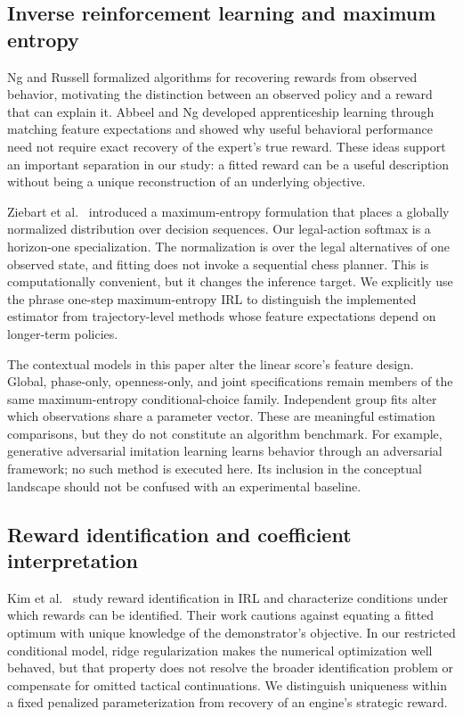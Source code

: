 \documentclass{jcst}
\begin{document}
\subsection{Inverse reinforcement learning and maximum entropy}
Ng and Russell \cite{ng2000} formalized algorithms for recovering rewards from observed behavior, motivating the distinction between an observed policy and a reward that can explain it. Abbeel and Ng \cite{abbeel} developed apprenticeship learning through matching feature expectations and showed why useful behavioral performance need not require exact recovery of the expert's true reward. These ideas support an important separation in our study: a fitted reward can be a useful description without being a unique reconstruction of an underlying objective.

Ziebart et al.\ \cite{ziebart} introduced a maximum-entropy formulation that places a globally normalized distribution over decision sequences. Our legal-action softmax is a horizon-one specialization. The normalization is over the legal alternatives of one observed state, and fitting does not invoke a sequential chess planner. This is computationally convenient, but it changes the inference target. We explicitly use the phrase one-step maximum-entropy IRL to distinguish the implemented estimator from trajectory-level methods whose feature expectations depend on longer-term policies.

The contextual models in this paper alter the linear score's feature design. Global, phase-only, openness-only, and joint specifications remain members of the same maximum-entropy conditional-choice family. Independent group fits alter which observations share a parameter vector. These are meaningful estimation comparisons, but they do not constitute an algorithm benchmark. For example, generative adversarial imitation learning \cite{gail} learns behavior through an adversarial framework; no such method is executed here. Its inclusion in the conceptual landscape should not be confused with an experimental baseline.

\subsection{Reward identification and coefficient interpretation}
Kim et al.\ \cite{kim} study reward identification in IRL and characterize conditions under which rewards can be identified. Their work cautions against equating a fitted optimum with unique knowledge of the demonstrator's objective. In our restricted conditional model, ridge regularization makes the numerical optimization well behaved, but that property does not resolve the broader identification problem or compensate for omitted tactical continuations. We distinguish uniqueness within a fixed penalized parameterization from recovery of an engine's strategic reward.
\end{document}
